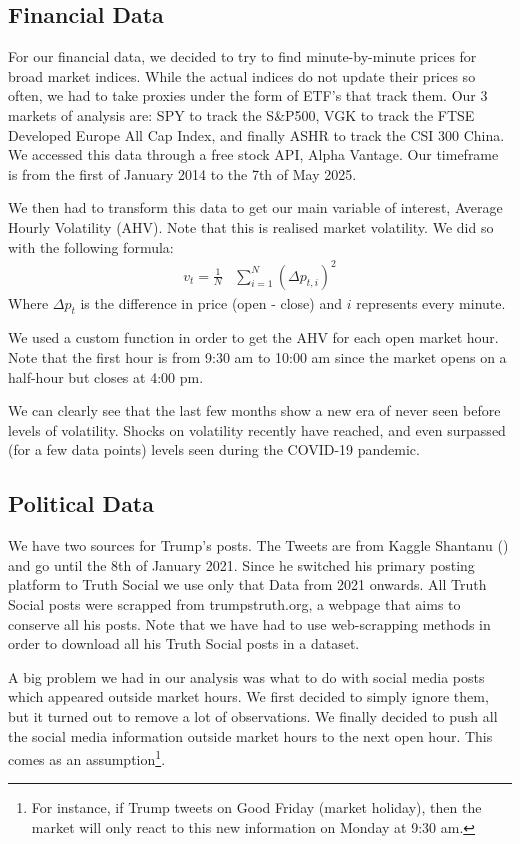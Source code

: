 \documentclass[
]{article}
\begin{document}
\subsection{Financial Data}\label{financial-data}

For our financial data, we decided to try to find minute-by-minute prices for
broad market indices. While the actual indices do not update their prices so often,
we had to take proxies under the form of ETF's that track them. Our 3 markets of
analysis are: SPY to track the S\&P500, VGK to track the FTSE Developed Europe
All Cap Index, and finally ASHR to track the CSI 300 China. We accessed this data
through a free stock API, Alpha Vantage. Our timeframe is from the first
of January 2014 to the 7th of May 2025.

We then had to transform this data to get our main variable of interest, Average
Hourly Volatility (AHV). Note that this is realised market volatility. We did so
with the following formula:
\[
\begin{aligned}
  v_t = \frac{1}{N}&\sum_{i=1}^N(\Delta p_{t,i})^2 
\end{aligned}
\]
Where \(\Delta p_t\) is the difference in price (open - close) and \(i\) represents
every minute.

We used a custom function in order to get the AHV for each open market hour. Note
that the first hour is from 9:30 am to 10:00 am since the market opens on a half-hour
but closes at 4:00 pm.

We can clearly see that the last few months show a new era of never seen before
levels of volatility. Shocks on volatility recently have reached, and even surpassed
(for a few data points) levels seen during the COVID-19 pandemic.

\subsection{Political Data}\label{political-data}

We have two sources for Trump's posts. The Tweets are from Kaggle
Shantanu () and go until the 8th of January 2021. Since he
switched his primary posting platform to Truth Social we use only that
Data from 2021 onwards. All Truth Social posts were scrapped from
trumpstruth.org, a webpage that aims to conserve all his posts. Note that we have
had to use web-scrapping methods in order to download all his Truth Social posts
in a dataset.

A big problem we had in our analysis was what to do with social media posts
which appeared outside market hours. We first decided to simply ignore them, but
it turned out to remove a lot of observations. We finally decided to push all the
social media information outside market hours to the next open hour. This comes
as an assumption\footnote{For instance, if Trump tweets on Good Friday (market holiday), then the
  market will only react to this new information on Monday at 9:30 am.}.
\end{document}
